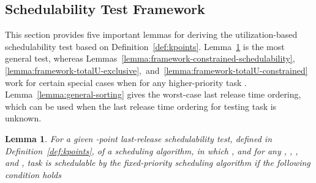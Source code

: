 \documentclass[10pt,conference]{IEEEtran}
\newtheorem{lemma}{Lemma}
\begin{document}
\subsection{Schedulability Test Framework}

This section provides five important lemmas for deriving the
utilization-based schedulability test based on
Definition~\ref{def:kpoints}. Lemma~\ref{lemma:framework-general-schedulability}
is the most general test, whereas
Lemmas~\ref{lemma:framework-constrained-schedulability},
\ref{lemma:framework-totalU-exclusive},~and~\ref{lemma:framework-totalU-constrained} work for certain special
cases when  for any higher-priority
task . Lemma~\ref{lemma:general-sorting} gives the worst-case last release time ordering, 
which can be used when the last release time ordering for testing task  is unknown.
  
\begin{lemma}
\label{lemma:framework-general-schedulability}
For a given -point last-release schedulability test, defined in
Definition~\ref{def:kpoints}, of a scheduling 
algorithm,
in which , and  for any
, , , and , task  is schedulable by the
fixed-priority scheduling
algorithm if the following condition holds

\end{lemma}
\end{document}
